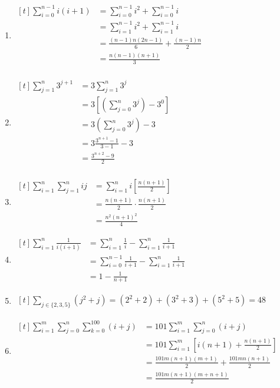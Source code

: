 \documentclass[12pt, letterpaper]{article}
\begin{document}
\begin{enumerate}
      \item $ \begin{aligned}[t]
        \sum^{n - 1}_{i = 0} i(i + 1)
        & = \sum^{n-1}_{i = 0} i^2 + \sum^{n - 1}_{i = 0} i \\
        & = \sum^{n-1}_{i = 1} i^2 + \sum^{n - 1}_{i = 1} i \\
        & = \frac{(n - 1)n(2n - 1)}{6} + \frac{(n - 1)n}{2} \\
        & = \frac{n(n - 1)(n + 1)}{3} \\
      \end{aligned} $


    \item $ \begin{aligned}[t]
      \sum^{n}_{j = 1} 3^{j + 1}
      & = 3\sum^{n}_{j = 1} 3^j \\
      & = 3[(\sum^{n}_{j = 0} 3^j) - 3^0] \\
      & = 3(\sum^{n}_{j = 0} 3^j) - 3 \\
      & = 3\frac{3^{n + 1} - 1}{3 - 1} - 3 \\
      & = \frac{3^{n + 2} - 9}{2} \\
    \end{aligned} $

    \item $ \begin{aligned}[t]
      \sum^{n}_{i = 1} \sum^{n}_{j = 1} ij
      & = \sum^{n}_{i = 1} i [\frac{n(n + 1)}{2}] \\ 
      & = \frac{n(n + 1)}{2} \cdot \frac{n(n + 1)}{2} \\
      & = \frac{n^2{(n + 1)}^2}{4}
    \end{aligned} $

    \item $ \begin{aligned}[t]
      \sum^{n}_{i = 1} \frac{1}{i(i + 1)}
      & = \sum^{n}_{i = 1} \frac{1}{i} - \sum^{n}_{i = 1} \frac{1}{i + 1} \\
      & = \sum^{n - 1}_{i = 0} \frac{1}{i + 1} - \sum^{n}_{i = 1} \frac{1}{i + 1} \\
      & = 1 - \frac{1}{n + 1}
    \end{aligned} $

    \item $ \begin{aligned}[t]
      \sum_{j \in \{2, 3, 5\}} (j^2 + j) = (2^2 + 2) + (3^2 + 3) + (5^2 + 5) = 48
    \end{aligned} $

    \item $ \begin{aligned}[t]
        \sum^{m}_{i = 1} \sum^{n}_{j = 0} \sum^{100}_{k = 0} (i + j)
        & = 101 \sum^{m}_{i = 1} \sum^{n}_{j = 0} (i + j) \\
        & = 101 \sum^{m}_{i = 1} [i(n + 1) + \frac{n(n + 1)}{2}] \\
        & = \frac{101m(n + 1)(m + 1)}{2} + \frac{101mn(n + 1)}{2} \\
        & = \frac{101m(n + 1)(m + n + 1)}{2}
    \end{aligned} $

  \end{enumerate}
\end{document}
